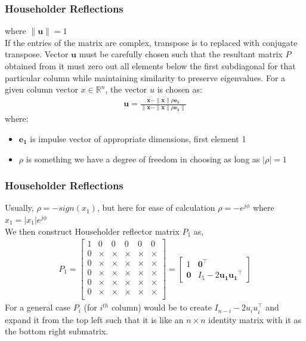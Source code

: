 \documentclass{beamer}
\theoremstyle{remark}
\numberwithin{equation}{section}
\begin{document}
    \begin{frame}
      \frametitle{Householder Reflections}
      where $\|\textbf{u}\|=1$\\    
      If the entries of the matrix are complex, transpose is to replaced with conjugate transpose.
      Vector $\textbf{u}$ must be carefully chosen such that the resultant matrix $P$ obtained from it must zero out all elements below the first subdiagonal for that particular column while maintaining similarity to preserve eigenvalues.
      For a given column vector $x \in \mathbb{R}^n$, the vector $u$ is chosen as:
      \begin{align}
        \mathbf{u} = \frac{\mathbf{x} - \|\mathbf{x}\| \rho \mathbf{e_1}}{\|\mathbf{x} - \|\mathbf{x}\| \rho \mathbf{e_1}\|}
      \end{align}
      where:
      \begin{itemize}
        \item $\mathbf{e_1}$ is impulse vector of appropriate dimensions, first element 1
        \item $\rho$ is something we have a degree of freedom in choosing as long as $|\rho|=1$
      \end{itemize}
    \end{frame}
    \begin{frame}
      \frametitle{Householder Reflections}

      Usually, $\rho=-sign(x_1)$, but here for ease of calculation $\rho= -e^{j\phi}$ where $x_1=|x_1| e^{j\phi}$\\
      We then construct Householder reflector matrix $P_1$ as,
      \begin{align}
        P_1 = \begin{bmatrix}
          1 & 0 & 0 & 0 & 0 & 0 \\
          0 & \times & \times & \times & \times & \times \\
          0 & \times & \times & \times & \times & \times \\
          0 & \times & \times & \times & \times & \times \\
          0 & \times & \times & \times & \times & \times \\
          0 & \times & \times & \times & \times & \times \\
        \end{bmatrix} =
        \begin{bmatrix}
          1 & \mathbf{0}^{\top} \\
          \mathbf{0} & I_5 - 2\mathbf{u_1 u_1}^{\top}
        \end{bmatrix}
      \end{align}
      For a general case $P_i$ (for $i^{th}$ column) would be to create $I_{n-i} - 2u_i u_i^{\top}$ and expand it from the top left such that it is like an $n\times n$ identity matrix with it as the bottom right submatrix. 
    \end{frame}
\end{document}
